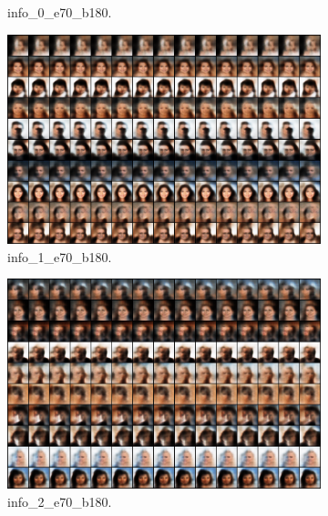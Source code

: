 \begin{figure}[!htbp]
\begin{subfigure}[t]{0.98\textwidth}
   \caption{info_0_e70_b180.}
   \label{fig:.._.._notes_journal_figures_2019-04-30_celeba_fixed-cost_info-b}
\end{subfigure}
\begin{subfigure}[t]{0.98\textwidth}
   \includegraphics[width=\textwidth,max height=0.17\textheight,center]{2019-04-30/celeba/fixed-cost/info/info_1_e70_b180.png}
   \caption{info_1_e70_b180.}
   \label{fig:.._.._notes_journal_figures_2019-04-30_celeba_fixed-cost_info-c}
\end{subfigure}
\begin{subfigure}[t]{0.98\textwidth}
   \includegraphics[width=\textwidth,max height=0.17\textheight,center]{2019-04-30/celeba/fixed-cost/info/info_2_e70_b180.png}
   \caption{info_2_e70_b180.}
   \label{fig:.._.._notes_journal_figures_2019-04-30_celeba_fixed-cost_info-d}
\end{subfigure}
\begin{subfigure}[t]{0.98\textwidth}

\end{subfigure}
\end{figure}

